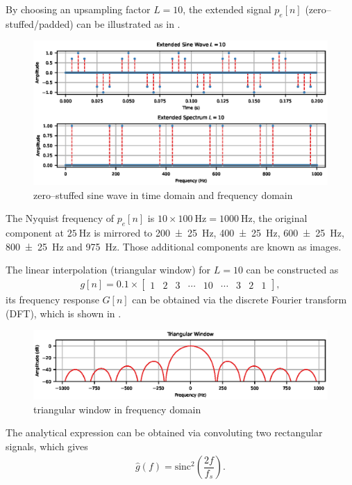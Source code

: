 By choosing an upsampling factor $L=10$, the extended signal $p_e[n]$ (zero--stuffed/padded) can be illustrated as in .
\begin{figure}[htb!]
\centering
\includegraphics{PIC/PureSineExtended}
\caption{zero--stuffed sine wave in time domain and frequency domain}\label{fig:extended}
\end{figure}
The Nyquist frequency of $p_e[n]$ is $10\times\SI{100}{\hertz}=\SI{1000}{\hertz}$, the original component at $\SI{25}{\hertz}$ is mirrored to \SI[separate-uncertainty=true]{200\pm25}{\hertz}, \SI[separate-uncertainty=true]{400\pm25}{\hertz}, \SI[separate-uncertainty=true]{600\pm25}{\hertz}, \SI[separate-uncertainty=true]{800\pm25}{\hertz} and \SI{975}{\hertz}. Those additional components are known as images.

The linear interpolation (triangular window) for $L=10$ can be constructed as
\begin{gather}
g[n]=0.1\times\begin{bmatrix}
1&2&3&\cdots&10&\cdots&3&2&1
\end{bmatrix},
\end{gather}
its frequency response $G[n]$ can be obtained via the discrete Fourier transform (DFT), which is shown in .
\begin{figure}[htb!]
\centering
\includegraphics{PIC/TriangularWindow}
\caption{triangular window in frequency domain}\label{fig:tri_window}
\end{figure}
The analytical expression can be obtained via convoluting two rectangular signals, which gives
\begin{gather}\label{eq:tri_kernel}
\hat{g}\left(f\right)=\text{sinc}^2\left(\dfrac{2f}{f_s}\right).
\end{gather}

